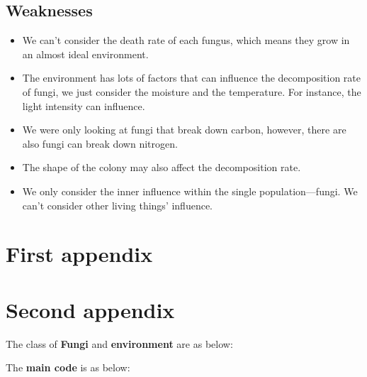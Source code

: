 \documentclass{mcmthesis}
\begin{document}
\subsection{Weaknesses}
\begin{itemize}
  \item We can't consider the death rate of each fungus, which means they grow in an almost ideal environment.
  \item The environment has lots of factors that can influence the decomposition rate of fungi, we just consider the moisture and the temperature.
  For instance, the light intensity can influence.
  \item We were only looking at fungi that break down carbon, however, there are also fungi can break down nitrogen.
  \item The shape of the colony may also affect the decomposition rate.
  \item We only consider the inner influence within the single population---fungi. We can't consider other living things' influence.
\end{itemize}

\medskip




\newpage

\begin{appendices}

\section{First appendix}


\newpage
\section{Second appendix}

% 
The class of \textcolor[rgb]{0.98,0,0}{\textbf{Fungi}} and \textcolor[rgb]{0.98,0,0}{\textbf{environment}} are as below:


The \textcolor[rgb]{0.98,0,0}{\textbf{main code}} is as below:


\end{appendices}
\end{document}
